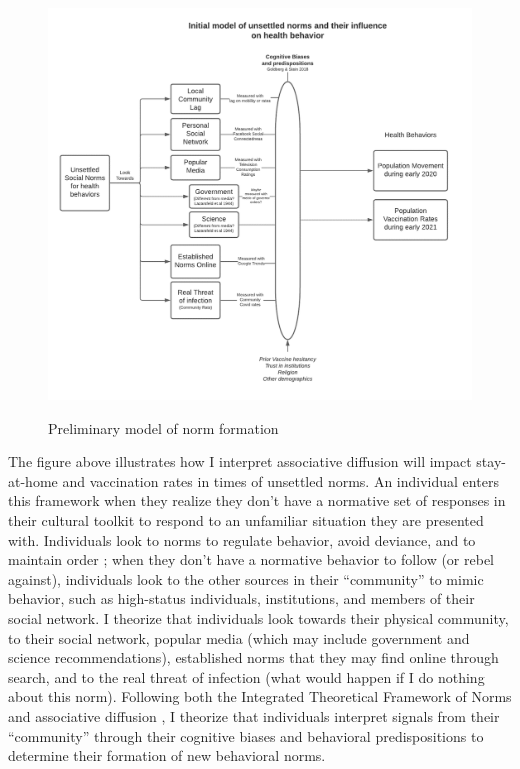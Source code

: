 \begin{figure}
{\centering \includegraphics[width=0.8\linewidth]{figs/paper3/model}}
\caption{Preliminary model of norm formation}\label{fig:norm-framework}
\end{figure}

The figure above illustrates how I interpret associative diffusion will impact
stay-at-home and vaccination rates in times of unsettled norms. An
individual enters this framework when they realize they don't have a normative
set of responses in their cultural toolkit to respond to an unfamiliar situation
they are presented with. Individuals look to norms to regulate behavior, avoid
deviance, and to maintain order \citep{horneNormsIntegratedFramework2020, shepherdStructurePerceptionHow2017}; when they don't have a normative behavior
to follow (or rebel against), individuals look to the other sources in their
``community'' to mimic behavior, such as high-status individuals, institutions,
and members of their social network. I theorize that individuals look towards
their physical community, to their social network, popular media (which may
include government and science recommendations), established norms that they may
find online through search, and to the real threat of infection (what would
happen if I do nothing about this norm). Following both the Integrated
Theoretical Framework of Norms \citep{horneNormsIntegratedFramework2020} and
associative diffusion \citep{dellapostaWhyLiberalsDrink2015, goldbergSocialContagionAssociative2018}, I theorize that individuals interpret
signals from their ``community'' through their cognitive biases and behavioral
predispositions to determine their formation of new behavioral norms.

